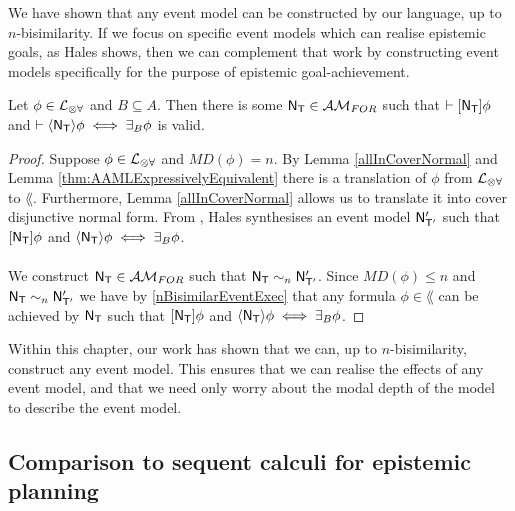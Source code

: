 We have shown that any event model can be constructed by our language, up to $n$-bisimilarity.
If we focus on specific event models which can realise epistemic goals, as Hales
\cite{hales13synthesis} shows, then we can complement that work by constructing event models
specifically for the purpose of epistemic goal-achievement.

\begin{corr} \label{approximatingBRestricted}
Let $\phi \in \mathcal{L}_{\otimes\forall}$ and $B \subseteq A$.
Then there is some $\mathrm{\mathsf{N}}_\mathrm{\mathsf{T}} \in \mathcal{AM}_{FOR}$ such that $\vdash [{\mathrm{\mathsf{N}}_\mathrm{\mathsf{T}}}] \phi$ and
$\vdash \langle { \ensuremath {\mathrm{\mathsf{N}}} _ \ensuremath {\mathrm{\mathsf{T}}} } \rangle \phi \iff \exists_B \phi$ is valid.
\end{corr}

\begin{proof}
Suppose $\phi \in \mathcal{L}_{\otimes\forall}$ and $MD(\phi) = n$.
By Lemma \ref{allInCoverNormal} and Lemma \ref{thm:AAMLExpressivelyEquivalent} there is a translation of $\phi$ from $\mathcal{L}_{\otimes\forall}$ to $\lang$.
Furthermore, Lemma \ref{allInCoverNormal} allows us to translate it into cover disjunctive normal form.
From \cite{hales13synthesis}, Hales synthesises an event model $\mathrm{\mathsf{N}}'_{\mathrm{\mathsf{T}}'}$ such that $[{\mathrm{\mathsf{N}}_\mathrm{\mathsf{T}}}] \phi$ and $\langle { \ensuremath {\mathrm{\mathsf{N}}} _ \ensuremath {\mathrm{\mathsf{T}}} } \rangle
\phi \iff \exists_B \phi$.\\
\\
We construct $\mathrm{\mathsf{N}}_\mathrm{\mathsf{T}} \in \mathcal{AM}_{FOR}$ such that $\mathrm{\mathsf{N}}_\mathrm{\mathsf{T}} \sim_n \mathrm{\mathsf{N}}'_{\mathrm{\mathsf{T}}'}$.
Since $MD(\phi) \leq n$ and $\mathrm{\mathsf{N}}_\mathrm{\mathsf{T}} \sim_n \mathrm{\mathsf{N}}'_{\mathrm{\mathsf{T}}'}$ we have by \ref{nBisimilarEventExec} that any
formula $\phi \in \lang$ can be achieved by $\mathrm{\mathsf{N}}_\mathrm{\mathsf{T}}$ such that $[{\mathrm{\mathsf{N}}_\mathrm{\mathsf{T}}}] \phi$ and $\langle { \ensuremath {\mathrm{\mathsf{N}}} _ \ensuremath {\mathrm{\mathsf{T}}} } \rangle \phi
\iff \exists_B \phi$.
\end{proof}

Within this chapter, our work has shown that we can, up to $n$-bisimilarity, construct any event
model.
This ensures that we can realise the effects of any event model, and that we need only worry about
the modal depth of the model to describe the event model.

\subsection{Comparison to sequent calculi for epistemic planning} \label{subsec:multi:sequentCalc}

